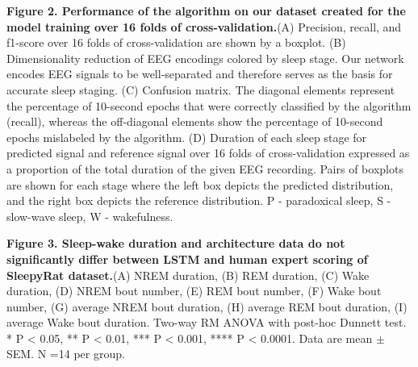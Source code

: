 \documentclass[pdflatex,sn-mathphys-num]{sn-jnl}%
\theoremstyle{thmstyleone}%
\theoremstyle{thmstyletwo}%
\theoremstyle{thmstylethree}%
\begin{document}
\noindent
\textbf{Figure 2. Performance of the algorithm on our dataset created for the model training over 16 folds of cross-validation.}\quad (A) Precision, recall, and f1-score over 16 folds of cross-validation are shown by a boxplot. (B) Dimensionality reduction of EEG encodings colored by sleep stage. Our network encodes EEG signals to be well-separated and therefore serves as the basis for accurate sleep staging. (C) Confusion matrix. The diagonal elements represent the percentage of 10-second epochs that were correctly classified by the algorithm (recall), whereas the off-diagonal elements show the percentage of 10-second epochs mislabeled by the algorithm. (D) Duration of each sleep stage for predicted signal and reference signal over 16 folds of cross-validation expressed as a proportion of the total duration of the given EEG recording.  Pairs of boxplots are shown for each stage where the left box depicts the predicted distribution, and the right box depicts the reference distribution. P - paradoxical sleep, S - slow-wave sleep, W - wakefulness.
\vspace{12pt} %

\noindent
\textbf{Figure 3. Sleep-wake duration and architecture data do not significantly differ between LSTM and human expert scoring of SleepyRat dataset.}\quad (A) NREM duration, (B) REM duration, (C) Wake duration, (D) NREM bout number, (E) REM bout number, (F) Wake bout number, (G) average NREM bout duration, (H) average REM bout duration, (I) average Wake bout duration. Two-way RM ANOVA with post-hoc Dunnett test. *  P < 0.05, ** P < 0.01, *** P < 0.001, **** P < 0.0001. Data are mean $\pm$ SEM. N =14 per group.
\end{document}

